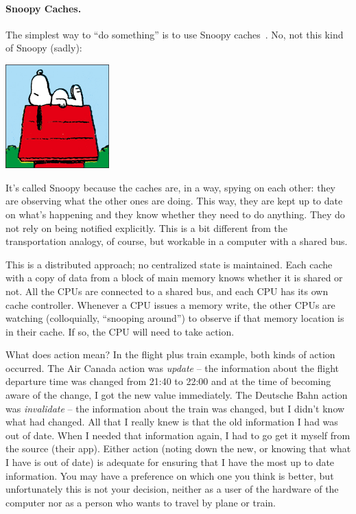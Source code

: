 \documentclass[a4paper]{report}
\begin{document}
\paragraph{Snoopy Caches.} The simplest way to ``do something''
is to use Snoopy caches~\cite{snoopycache}. No, not this kind of Snoopy (sadly):

\begin{center}
	\includegraphics[width=0.3\textwidth]{images/peanuts-snoopy1.jpg}
\end{center}

It's called Snoopy because the caches are, in a way, spying on each other: they are observing what the other ones are doing. This way, they are kept up to date on what's happening and they know whether they need to do anything. They do not rely on being notified explicitly. This is a bit different from the transportation analogy, of course, but workable in a computer with a shared bus.

This is a distributed approach; no centralized state is maintained. Each cache with a copy of data from a block of main memory knows whether it is shared or not. All the CPUs are connected to a shared bus, and each CPU has its own cache controller. Whenever a CPU issues a memory write, the other CPUs are watching (colloquially, ``snooping around'') to observe if that memory location is in their cache. If so, the CPU will need to take action.

What does action mean? In the flight plus train example, both kinds of action occurred. The Air Canada action was \textit{update} -- the information about the flight departure time was changed from 21:40 to 22:00 and at the time of becoming aware of the change, I got the new value immediately. The Deutsche Bahn action was \textit{invalidate} -- the information about the train was changed, but I didn't know what had changed. All that I really knew is that the old information I had was out of date. When I needed that information again, I had to go get it myself from the source (their app). Either action (noting down the new, or knowing that what I have is out of date) is adequate for ensuring that I have the most up to date information. You may have a preference on which one you think is better, but unfortunately this is not your decision, neither as a user of the hardware of the computer nor as  a person who wants to travel by plane or train.
\end{document}

